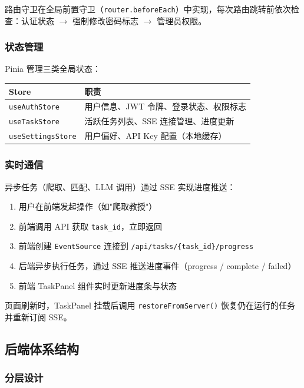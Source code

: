 \documentclass[11pt]{article}
\begin{document}
路由守卫在全局前置守卫（\texttt{router.beforeEach}）中实现，每次路由跳转前依次检查：认证状态 $\rightarrow$ 强制修改密码标志 $\rightarrow$ 管理员权限。

\subsubsection{状态管理}

Pinia 管理三类全局状态：

\begin{center}
\begin{tabular}{|l|l|}
\hline
\textbf{Store} & \textbf{职责} \\
\hline
\texttt{useAuthStore} & 用户信息、JWT 令牌、登录状态、权限标志 \\
\texttt{useTaskStore} & 活跃任务列表、SSE 连接管理、进度更新 \\
\texttt{useSettingsStore} & 用户偏好、API Key 配置（本地缓存） \\
\hline
\end{tabular}
\end{center}

\subsubsection{实时通信}

异步任务（爬取、匹配、LLM 调用）通过 SSE 实现进度推送：

\begin{enumerate}
    \item 用户在前端发起操作（如"爬取教授"）
    \item 前端调用 API 获取 \texttt{task\_id}，立即返回
    \item 前端创建 \texttt{EventSource} 连接到 \texttt{/api/tasks/\{task\_id\}/progress}
    \item 后端异步执行任务，通过 SSE 推送进度事件（progress / complete / failed）
    \item 前端 TaskPanel 组件实时更新进度条与状态
\end{enumerate}

页面刷新时，TaskPanel 挂载后调用 \texttt{restoreFromServer()} 恢复仍在运行的任务并重新订阅 SSE。

\subsection{后端体系结构}

\subsubsection{分层设计}
\end{document}
